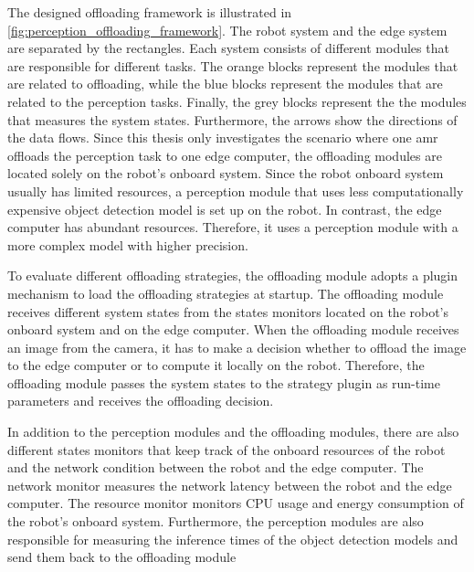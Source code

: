 
The designed offloading framework is illustrated in \cref{fig:perception_offloading_framework}. The robot system and the edge system are separated by the rectangles. Each system consists of different modules that are responsible for different tasks. The orange blocks represent the modules that are related to offloading, while the blue blocks represent the modules that are related to the perception tasks. Finally, the grey blocks represent the the modules that measures the system states. Furthermore, the arrows show the directions of the data flows. Since this thesis only investigates the scenario where one \gls{amr} offloads the perception task to one edge computer, the offloading modules are located solely on the robot's onboard system. Since the robot onboard system usually has limited resources, a perception module that uses less computationally expensive object detection model is set up on the robot. In contrast, the edge computer has abundant resources. Therefore, it uses a perception module with a more complex model with higher precision. 


To evaluate different offloading strategies, the offloading module adopts a plugin mechanism to load the offloading strategies at startup. The offloading module receives different system states from the states monitors located on the robot's onboard system and on the edge computer. When the offloading module receives an image from the camera, it has to make a decision whether to offload the image to the edge computer or to compute it locally on the robot. Therefore, the offloading module passes the system states to the strategy plugin as run-time parameters and receives the offloading decision. 

In addition to the perception modules and the offloading modules, there are also different states monitors that keep track of the onboard resources of the robot and the network condition between the robot and the edge computer. The network monitor measures the network latency between the robot and the edge computer. The resource monitor monitors CPU usage and energy consumption of the robot's onboard system. Furthermore, the perception modules are also responsible for measuring the inference times of the object detection models and send them back to the offloading module 


